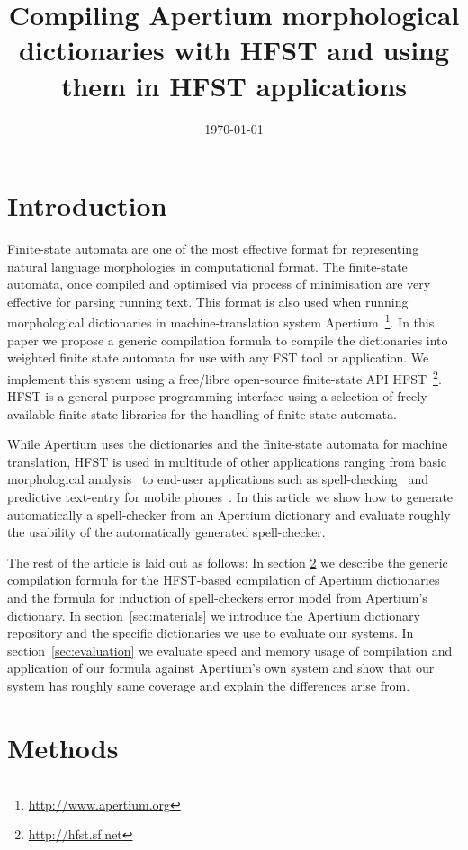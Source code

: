 \documentclass[10pt,a4paper]{article}
\title{Compiling Apertium morphological dictionaries with HFST and using them
in HFST applications}
\date{\today}
\begin{document}
\maketitleabstract

\section{Introduction}

Finite-state automata are one of the most effective format for representing
natural language morphologies in computational format. The finite-state
automata, once compiled and optimised via process of minimisation are very
effective for parsing running text. This format is also used when running
morphological dictionaries in machine-translation system
Apertium~\cite{Apertium/2011}\footnote{\url{http://www.apertium.org}}. In this
paper we propose a generic compilation formula  to compile the
dictionaries into weighted finite state automata for use with any FST 
tool or application.  We implement this system using a free/libre
open-source finite-state API
HFST~\cite{hfst/2011}\footnote{\url{http://hfst.sf.net}}. HFST is a general
purpose programming interface using a selection of freely-available
finite-state libraries for the handling of finite-state automata.

While Apertium uses the dictionaries and the finite-state automata for machine
translation, HFST is used in multitude of other applications ranging from
basic morphological analysis~\cite{hfst/2011}
to end-user applications such as spell-checking~\cite{pirinen/2010/lrec} and
predictive text-entry for mobile phones~\cite{silfverberg/2011/cla}. In this
article we show how to generate automatically a spell-checker from an Apertium
dictionary and evaluate roughly the usability of the automatically generated
spell-checker.

The rest of the article is laid out as follows: In section \ref{sec:methods}
we describe the generic compilation formula for the HFST-based compilation of
Apertium dictionaries and the formula for induction of spell-checkers error
model from Apertium's dictionary. In section~\ref{sec:materials} we introduce
the Apertium dictionary repository and the specific dictionaries we use to
evaluate our systems. In section~\ref{sec:evaluation} we evaluate speed and
memory usage of compilation and application of our formula against Apertium's
own system and show that our system has roughly same coverage and explain
the differences arise from.

\section{Methods}
\label{sec:methods}
\end{document}
